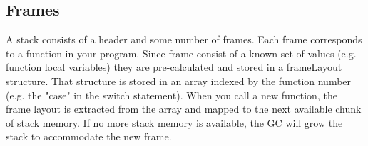 \subsection{Frames}

A stack consists of a header and some number of frames. Each frame corresponds to a function in your program. Since frame consist of a known set of values (e.g. function local variables) they are pre-calculated and stored in a frameLayout structure. That structure is stored in an array indexed by the function number (e.g. the "case" in the switch statement). When you call a new function, the frame layout is extracted from the array and mapped to the next available chunk of stack memory. If no more stack memory is available, the GC will grow the stack to accommodate the new frame. 
